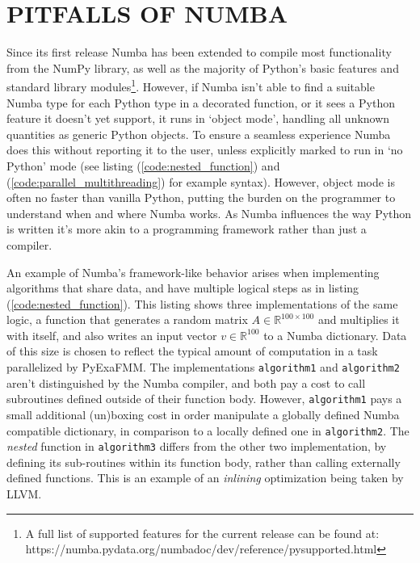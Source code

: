 \documentclass{IEEEcsmag}
\begin{document}


\section{PITFALLS OF NUMBA}\label{sec:pitfalls}

Since its first release Numba has been extended to compile most functionality from the NumPy library, as well as the majority of Python's basic features and standard library modules\footnote{A full list of supported features for the current release can be found at: https://numba.pydata.org/numba\-doc/dev/reference/pysupported.html}. However, if Numba isn't able to find a suitable Numba type for each Python type in a decorated function, or it sees a Python feature it doesn't yet support, it runs in `object mode', handling all unknown quantities as generic Python objects. To ensure a seamless experience Numba does this without reporting it to the user, unless explicitly marked to run in `no Python' mode (see listing (\ref{code:nested_function}) and (\ref{code:parallel_multithreading}) for example syntax). However, object mode is often no faster than vanilla Python, putting the burden on the programmer to understand when and where Numba works. As Numba influences the way Python is written it's more akin to a programming framework rather than just a compiler.

An example of Numba's framework-like behavior arises when implementing algorithms that share data, and have multiple logical steps as in listing (\ref{code:nested_function}). This listing shows three implementations of the same logic, a function that generates a random matrix $A \in \mathbb{R}^{100 \times 100}$ and multiplies it with itself, and also writes an input vector $v \in \mathbb{R}^{100}$ to a Numba dictionary. Data of this size is chosen to reflect the typical amount of computation in a task parallelized by PyExaFMM. The implementations \lstinline{algorithm1} and \lstinline{algorithm2} aren't distinguished by the Numba compiler, and both pay a cost to call subroutines defined outside of their function body. However, \lstinline{algorithm1} pays a small additional (un)boxing cost in order manipulate a globally defined Numba compatible dictionary, in comparison to a locally defined one in \lstinline{algorithm2}. The \textit{nested} function in \lstinline{algorithm3} differs from the other two implementation, by defining its sub-routines within its function body, rather than calling externally defined functions. This is an example of an \textit{inlining} optimization being taken by LLVM.
\end{document}
